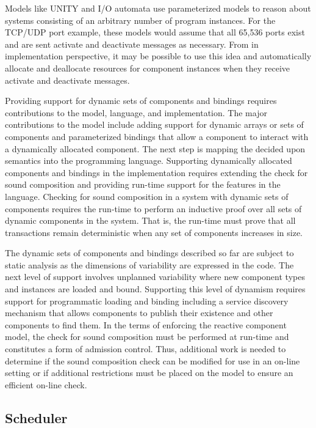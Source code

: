 Models like UNITY and I/O automata use parameterized models to reason about systems consisting of an arbitrary number of program instances.
For the TCP/UDP port example, these models would assume that all 65,536 ports exist and are sent activate and deactivate messages as necessary.
From in implementation perspective, it may be possible to use this idea and automatically allocate and deallocate resources for component instances when they receive activate and deactivate messages.

Providing support for dynamic sets of components and bindings requires contributions to the model, language, and implementation.
The major contributions to the model include adding support for dynamic arrays or sets of components and parameterized bindings that allow a component to interact with a dynamically allocated component.
The next step is mapping the decided upon semantics into the \rcgo{} programming language.
Supporting dynamically allocated components and bindings in the implementation requires extending the check for sound composition and providing run-time support for the features in the language.
Checking for sound composition in a system with dynamic sets of components requires the run-time to perform an inductive proof over all sets of dynamic components in the system.
That is, the run-time must prove that all transactions remain deterministic when any set of components increases in size.

The dynamic sets of components and bindings described so far are subject to static analysis as the dimensions of variability are expressed in the code.
The next level of support involves unplanned variability where new component types and instances are loaded and bound.
Supporting this level of dynamism requires support for programmatic loading and binding including a service discovery mechanism that allows components to publish their existence and other components to find them.
In the terms of enforcing the reactive component model, the check for sound composition must be performed at run-time and constitutes a form of admission control.
Thus, additional work is needed to determine if the sound composition check can be modified for use in an on-line setting or if additional restrictions must be placed on the model to ensure an efficient on-line check.

\subsection{Scheduler}
\label{future_scheduler}

